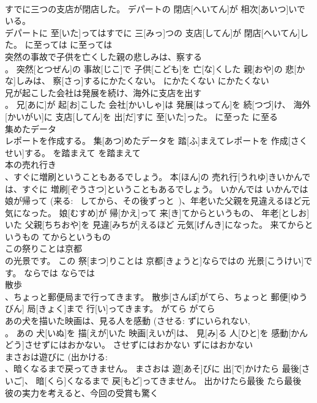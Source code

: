 \documentclass[8pt]{extreport}
\begin{document}
\begin{CJK}{UTF8}{min}
\\	すでに三つの支店が閉店した。	デパートの 閉店[へいてん]が 相次[あいつ]いでいる。 
\\	[えい]デパートに 至[いた]ってはすでに 三[みっ]つの 支店[してん]が 閉店[へいてん]した。	に至っては	に至っては	
\\	突然の事故で子供を亡くした親の悲しみは、察する 
\\	。	突然[とつぜん]の 事故[じこ]で 子供[こども]を 亡[な]くした 親[おや]の 悲[かな]しみは、 察[さっ]するにかたくない。	にかたくない	にかたくない	
\\	兄が起こした会社は発展を続け、海外に支店を出す 
\\	。	兄[あに]が 起[お]こした 会社[かいしゃ]は 発展[はってん]を 続[つづ]け、 海外[かいがい]に 支店[してん]を 出[だ]すに 至[いた]った。	に至った	に至る	
\\	集めたデータ 
\\	レポートを作成する。	集[あつ]めたデータを 踏[ふ]まえてレポートを 作成[さくせい]する。	を踏まえて	を踏まえて	
\\	本の売れ行き 
\\	、すぐに増刷ということもあるでしょう。	本[ほん]の 売れ行[うれゆ]きいかんでは、すぐに 増刷[ぞうさつ]ということもあるでしょう。	いかんでは	いかんでは	
\\	娘が帰って (来る: ~してから、その後ずっと~)、年老いた父親を見違えるほど元気になった。	娘[むすめ]が 帰[かえ]って 来[き]てからというもの、 年老[としお]いた 父親[ちちおや]を 見違[みちが]えるほど 元気[げんき]になった。	来てからというもの	てからというもの	
\\	この祭りことは京都 
\\	の光景です。	この 祭[まつ]りことは 京都[きょうと]ならではの 光景[こうけい]です。	ならでは	ならでは	
\\	散歩 
\\	、ちょっと郵便局まで行ってきます。	散歩[さんぽ]がてら、ちょっと 郵便[ゆうびん] 局[きょく]まで 行[い]ってきます。	がてら	がてら	
\\	あの犬を描いた映画は、見る人を感動 (させる: ずにいられない, 
\\	。	あの 犬[いぬ]を 描[えが]いた 映画[えいが]は、 見[み]る 人[ひと]を 感動[かんどう]させずにはおかない。	させずにはおかない	ずにはおかない	
\\	まさおは遊びに (出かける: 
\\	、暗くなるまで戻ってきません。	まさおは 遊[あそ]びに 出[で]かけたら 最後[さいご]、 暗[くら]くなるまで 戻[もど]ってきません。	出かけたら最後	たら最後	
\\	彼の実力を考えると、今回の受賞も驚く 

\end{CJK}
\end{document}
